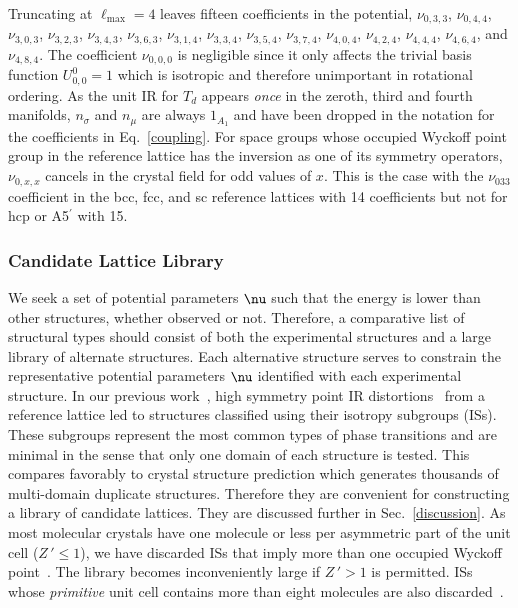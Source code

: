 \documentclass[preprint]{iucr}              %
\newcommand{\mb}[1]{\ensuremath{\mbox{\boldmath $ #1 $}}}
\begin{document}
Truncating at $\ell_\mathrm{max}=4$ leaves fifteen coefficients in
the potential, $\nu_{0,3,3}$, $\nu_{0,4,4}$, $\nu_{3,0,3}$,
$\nu_{3,2,3}$, $\nu_{3,4,3}$, $\nu_{3,6,3}$, $\nu_{3,1,4}$,
$\nu_{3,3,4}$, $\nu_{3,5,4}$, $\nu_{3,7,4}$, $\nu_{4,0,4}$,
$\nu_{4,2,4}$, $\nu_{4,4,4}$, $\nu_{4,6,4}$, and $\nu_{4,8,4}$. The
coefficient $\nu_{0,0,0}$ is negligible since it only affects the
trivial basis function $U_{0,0}^0=1$ which is isotropic and
therefore unimportant in rotational ordering.  As the unit IR for
$T_d$ appears \emph{once} in the zeroth, third and fourth manifolds,
$n_\sigma$ and $n_\mu$ are always $1_{A_1}$ and have been dropped in
the notation for the coefficients in Eq.~\ref{coupling}. For space
groups whose occupied Wyckoff point group in the reference lattice
has the inversion as one of its symmetry operators, $\nu_{0,x,x}$
cancels in the crystal field for odd values of $x$. This is the case
with the $\nu_{033}$ coefficient in the bcc, fcc, and sc reference
lattices with 14 coefficients but not for hcp or A5$^\prime$ with
15.

\subsubsection{Candidate Lattice Library}
\label{collection}

We seek a set of potential parameters $\mb{\nu}$ such that the
energy is lower than other structures, whether observed or not.
Therefore, a comparative list of structural types should consist of
both the experimental structures and a large library of alternate
structures. Each alternative structure serves to constrain the
representative potential parameters \mb{\nu} identified with each
experimental structure.  In our previous work~\cite{Mettes04}, high
symmetry point IR distortions~\cite{Stokes88,Stokes02b} from a
reference lattice led to structures classified using their isotropy
subgroups (ISs). These subgroups represent the most common types of
phase transitions and are minimal in the sense that only one domain
of each structure is tested. This compares favorably to crystal
structure prediction which generates thousands of multi-domain
duplicate structures.  Therefore they are convenient for
constructing a library of candidate lattices. They are discussed
further in Sec.~\ref{discussion}.  As most molecular crystals have
one molecule or less per asymmetric part of the unit cell ($Z\,'\leq
1$), we have discarded ISs that imply more than one occupied Wyckoff
point~\cite{Padmaja90}. The library becomes inconveniently large if
$Z\,'> 1$ is permitted. ISs whose \emph{primitive} unit cell
contains more than eight molecules are also
discarded~\cite{Gdanitz97}.
\end{document}
